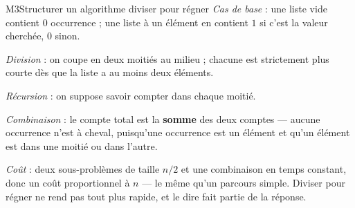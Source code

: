 \begin{fichemethode}{M3}{Structurer un algorithme diviser pour régner}
\emph{Cas de base} : une liste vide contient $0$ occurrence ; une liste à un élément en
contient $1$ si c'est la valeur cherchée, $0$ sinon.

\emph{Division} : on coupe en deux moitiés au milieu ; chacune est strictement plus courte
dès que la liste a au moins deux éléments.

\emph{Récursion} : on suppose savoir compter dans chaque moitié.

\emph{Combinaison} : le compte total est la \textbf{somme} des deux comptes — aucune
occurrence n'est à cheval, puisqu'une occurrence est un élément et qu'un élément est dans une
moitié ou dans l'autre.

\emph{Coût} : deux sous-problèmes de taille $n/2$ et une combinaison en temps constant, donc
un coût proportionnel à $n$ — le même qu'un parcours simple. Diviser pour régner ne rend pas
tout plus rapide, et le dire fait partie de la réponse.

%
%
%
%
%
%
%


\end{fichemethode}
